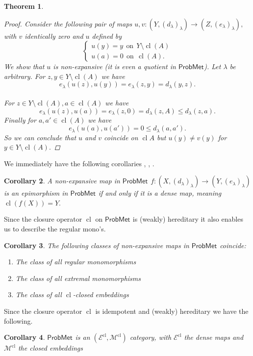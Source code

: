 \documentclass[12pt,a4paper]{amsart}
\theoremstyle{theorem}
\newtheorem{theorem}{Theorem}[section]
\newtheorem{corollary}[theorem]{Corollary}
\theoremstyle{definition}
\newcommand{\eee}{\ensuremath{\mathcal{E}}}
\newcommand{\mmm}{\ensuremath{\mathcal{M}}}
\newcommand{\PM}{\ensuremath{\mathsf{ProbMet_{}}}}
\DeclareMathOperator{\cl}{cl}
\renewcommand{\l}{\ensuremath{\lambda}}
\def\rw{\rightarrow}
\begin{document}
{\begin{theorem}
\begin{proof}
Consider the following pair of maps $u,v: (Y, (d_\l)_\l) \rw (Z, (e_\l)_\l),$ with $v$ identically zero and $u$ defined by
$$
  \begin{cases}  u(y) = y \ \  \text{on} \ \ Y \setminus \cl(A) \\
 u(a) = 0  \  \ \text{on} \  \  \cl(A).  \end{cases}
$$
We show that $u$ is non-expansive (it is even a quotient in $\PM$). Let $\l $ be arbitrary. For $z,y \in Y \setminus \cl(A)$ we have $$e_\l(u(z), u(y)) = e_\l(z,y) = d_\l(y,z).$$\\
For $z \in Y \setminus \cl(A), a \in \cl(A)$ we have $$e_\l(u(z), u(a)) = e_\l(z,0) = d_\l(z, A) \leq d_\l(z,a).$$
Finally for $a  , a'  \in \cl(A)$ we have $$e_\l(u(a), u(a')) = 0 \leq d_\l(a,a').$$ 
So we can conclude that $u$ and $v$ coincide on $\cl{A}$ but  $u(y) \not = v(y)$ for $y \in Y \setminus \cl(A).$ 

\end{proof}
\end{theorem}

We immediately have the following corollaries \cite{DGT}, \cite{DT}, \cite{CGT}.

\begin{corollary}\label{epi}
A non-expansive map in $\PM$  $f: (X,(d_\l)_\l) \rw (Y,(e_\l)_\l)$ is an epimorphism in $\PM$ if and only if it is a dense map, meaning $\cl (f(X)) = Y.$
\end{corollary}

Since the closure operator $\cl$ on $\PM$ is (weakly) hereditary it also enables us to describe the regular mono's.

\begin{corollary}
The following classes of non-expansive maps in $\PM$ coincide:
\begin{enumerate}
\item The class of all regular monomorphisms
\item The class of all extremal monomorphisms
\item The class of all $\cl$-closed embeddings
\end{enumerate}
\end{corollary}

Since the closure operator $\cl$ is idempotent and (weakly) hereditary we have the following.
\begin{corollary}
$\PM$ is an $(\eee^{\cl}, \mmm^{\cl})$ category, with $\eee^{\cl}$ the dense maps and $ \mmm^{\cl}$ the closed embeddings
\end{corollary}



}
\end{document}
